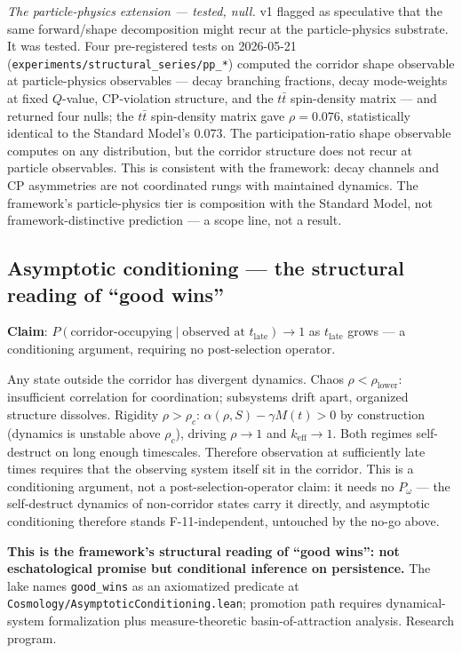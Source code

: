 \documentclass[11pt,a4paper]{article}
\newcommand{\keff}{k_{\text{eff}}}
\newcommand{\Pomega}{P_{\omega}}
\begin{document}
\emph{The particle-physics extension --- tested, null.} v1 flagged as speculative that the same forward/shape decomposition might recur at the particle-physics substrate. It was tested. Four pre-registered tests on 2026-05-21 (\texttt{experiments/structural\_series/pp\_*}) computed the corridor shape observable at particle-physics observables --- decay branching fractions, decay mode-weights at fixed $Q$-value, CP-violation structure, and the $t\bar{t}$ spin-density matrix --- and returned four nulls; the $t\bar{t}$ spin-density matrix gave $\rho = 0.076$, statistically identical to the Standard Model's $0.073$. The participation-ratio shape observable computes on any distribution, but the corridor structure does not recur at particle observables. This is consistent with the framework: decay channels and CP asymmetries are not coordinated rungs with maintained dynamics. The framework's particle-physics tier is composition with the Standard Model, not framework-distinctive prediction --- a scope line, not a result.

\subsection*{Asymptotic conditioning --- the structural reading of ``good wins''}

\textbf{Claim}: $P(\text{corridor-occupying} \mid \text{observed at } t_{\text{late}}) \to 1$ as $t_{\text{late}}$ grows --- a conditioning argument, requiring no post-selection operator.

Any state outside the corridor has divergent dynamics. Chaos $\rho < \rho_{\text{lower}}$: insufficient correlation for coordination; subsystems drift apart, organized structure dissolves. Rigidity $\rho > \rho_c$: $\alpha(\rho, S) - \gamma M(t) > 0$ by construction (dynamics is unstable above $\rho_c$), driving $\rho \to 1$ and $\keff \to 1$. Both regimes self-destruct on long enough timescales. Therefore observation at sufficiently late times requires that the observing system itself sit in the corridor. This is a conditioning argument, not a post-selection-operator claim: it needs no $\Pomega$ --- the self-destruct dynamics of non-corridor states carry it directly, and asymptotic conditioning therefore stands F-11-independent, untouched by the no-go above.

\textbf{This is the framework's structural reading of ``good wins'': not eschatological promise but conditional inference on persistence.} The lake names \texttt{good\_wins} as an axiomatized predicate at \texttt{Cosmology/AsymptoticConditioning.lean}; promotion path requires dynamical-system formalization plus measure-theoretic basin-of-attraction analysis. Research program.
\end{document}

